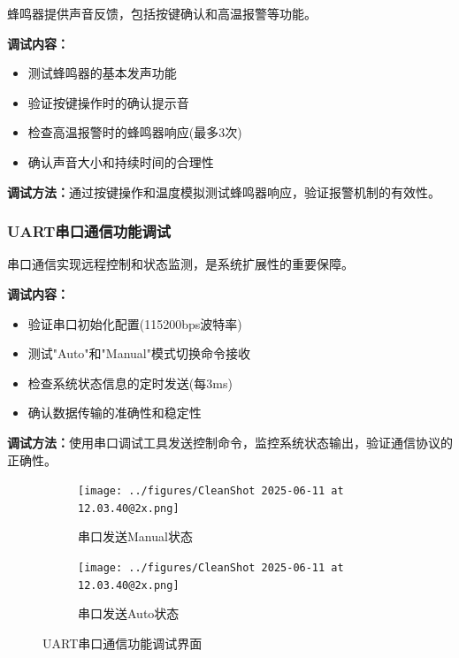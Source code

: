 \qquad 蜂鸣器提供声音反馈，包括按键确认和高温报警等功能。

\textbf{调试内容：}
\begin{itemize}
    \vspace{-6pt}
  \item 测试蜂鸣器的基本发声功能
    \vspace{-6pt}
  \item 验证按键操作时的确认提示音
    \vspace{-6pt}
  \item 检查高温报警时的蜂鸣器响应(最多3次)
    \vspace{-6pt}
  \item 确认声音大小和持续时间的合理性
\end{itemize}

\textbf{调试方法：}通过按键操作和温度模拟测试蜂鸣器响应，验证报警机制的有效性。

\subsubsection{UART串口通信功能调试}

\qquad 串口通信实现远程控制和状态监测，是系统扩展性的重要保障。

\textbf{调试内容：}
\begin{itemize}
    \vspace{-6pt}
  \item 验证串口初始化配置(115200bps波特率)
    \vspace{-6pt}
  \item 测试"Auto"和"Manual"模式切换命令接收
    \vspace{-6pt}
  \item 检查系统状态信息的定时发送(每3ms)
    \vspace{-6pt}
  \item 确认数据传输的准确性和稳定性
\end{itemize}

\textbf{调试方法：}使用串口调试工具发送控制命令，监控系统状态输出，验证通信协议的正确性。

\begin{figure}[H]
  \centering
  \begin{subfigure}{0.45\textwidth}
    \centering
    \texttt{[image: ../figures/CleanShot 2025-06-11 at 12.03.40@2x.png]}
    \caption{串口发送Manual状态}
  \end{subfigure}
  \hfil
  \begin{subfigure}{0.45\textwidth}
    \centering
    \texttt{[image: ../figures/CleanShot 2025-06-11 at 12.03.40@2x.png]}
    \caption{串口发送Auto状态}
  \end{subfigure}

  \caption{UART串口通信功能调试界面}
  \label{fig:uart_debug}
\end{figure}

